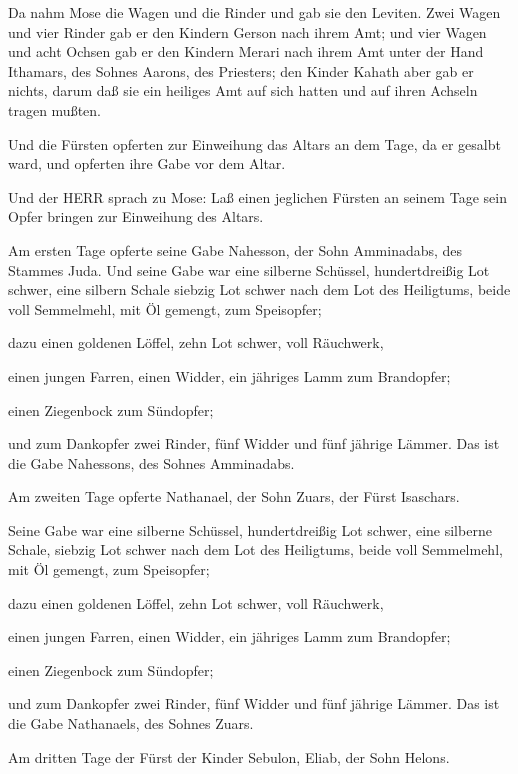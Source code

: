  Da nahm Mose die Wagen und die Rinder und gab sie den
Leviten.  Zwei Wagen und vier Rinder gab er den Kindern
Gerson nach ihrem Amt;  und vier Wagen und acht Ochsen gab
er den Kindern Merari nach ihrem Amt unter der Hand Ithamars, des Sohnes
Aarons, des Priesters;  den Kinder Kahath aber gab er
nichts, darum daß sie ein heiliges Amt auf sich hatten und auf ihren
Achseln tragen mußten.

 Und die Fürsten opferten zur Einweihung das Altars an dem
Tage, da er gesalbt ward, und opferten ihre Gabe vor dem Altar.

 Und der HERR sprach zu Mose: Laß einen jeglichen Fürsten
an seinem Tage sein Opfer bringen zur Einweihung des Altars.

 Am ersten Tage opferte seine Gabe Nahesson, der Sohn
Amminadabs, des Stammes Juda.  Und seine Gabe war eine
silberne Schüssel, hundertdreißig Lot schwer, eine silbern Schale
siebzig Lot schwer nach dem Lot des Heiligtums, beide voll Semmelmehl,
mit Öl gemengt, zum Speisopfer;

 dazu einen goldenen Löffel, zehn Lot schwer, voll
Räuchwerk,

 einen jungen Farren, einen Widder, ein jähriges Lamm zum
Brandopfer;

 einen Ziegenbock zum Sündopfer;

 und zum Dankopfer zwei Rinder, fünf Widder und fünf
jährige Lämmer. Das ist die Gabe Nahessons, des Sohnes Amminadabs.

 Am zweiten Tage opferte Nathanael, der Sohn Zuars, der
Fürst Isaschars.

 Seine Gabe war eine silberne Schüssel, hundertdreißig Lot
schwer, eine silberne Schale, siebzig Lot schwer nach dem Lot des
Heiligtums, beide voll Semmelmehl, mit Öl gemengt, zum Speisopfer;

 dazu einen goldenen Löffel, zehn Lot schwer, voll
Räuchwerk,

 einen jungen Farren, einen Widder, ein jähriges Lamm zum
Brandopfer;

 einen Ziegenbock zum Sündopfer;

 und zum Dankopfer zwei Rinder, fünf Widder und fünf
jährige Lämmer. Das ist die Gabe Nathanaels, des Sohnes Zuars.

 Am dritten Tage der Fürst der Kinder Sebulon, Eliab, der
Sohn Helons.


